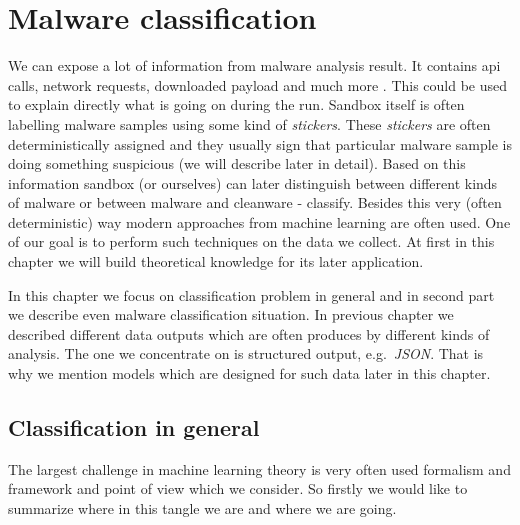 \chapter{Malware classification} \label{chap:classification}
We can expose a lot of information from malware analysis result. It contains api calls, network requests, downloaded payload and much more . This could be used to explain directly what is going on during the run. Sandbox itself is often labelling malware samples using some kind of \emph{stickers}. These \emph{stickers} are often deterministically assigned and they usually sign that particular malware sample is doing something suspicious (we will describe later in detail). Based on this information sandbox (or ourselves) can later distinguish between different kinds of malware or between malware and cleanware - classify. Besides this very (often deterministic) way modern approaches from machine learning are often used. One of our goal is to perform such techniques on the data we collect. At first in this chapter we will build theoretical knowledge for its later application.

In this chapter we focus on classification problem in general and in second part we describe even malware classification situation. In previous chapter we described different data outputs which are often produces by different kinds of analysis. The one we concentrate on is structured output, e.g.\ \emph{JSON}. That is why we mention models which are designed for such data later in this chapter.

\section{Classification in general}

The largest challenge in machine learning theory is very often used formalism and framework and point of view which we consider. So firstly we would like to summarize where in this tangle we are and where we are going.

 \cite{Russell2009}


